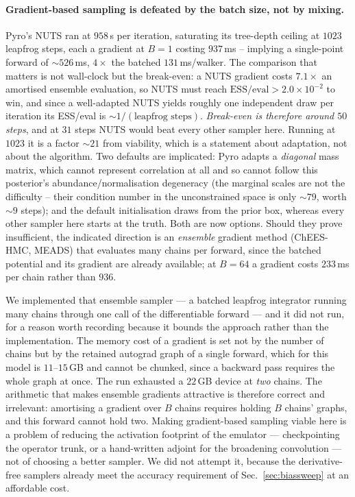 \documentclass[11pt,a4paper]{article}
\begin{document}
\paragraph{Gradient-based sampling is defeated by the batch size, not by
mixing.} Pyro's NUTS ran at $958\,$s per iteration, saturating its tree-depth
ceiling at $1023$ leapfrog steps, each a gradient at $B{=}1$ costing $937\,$ms
-- implying a single-point forward of ${\sim}526\,$ms, $4\times$ the batched
$131\,$ms/walker. The comparison that matters is not wall-clock but the
break-even: a NUTS gradient costs $7.1\times$ an amortised ensemble evaluation,
so NUTS must reach $\mathrm{ESS/eval}>2.0\times10^{-2}$ to win, and since a
well-adapted NUTS yields roughly one independent draw per iteration its
ESS/eval is ${\sim}1/(\text{leapfrog steps})$. \emph{Break-even is therefore
around $50$ steps}, and at $31$ steps NUTS would beat every other sampler here.
Running at $1023$ it is a factor ${\sim}21$ from viability, which is a statement
about adaptation, not about the algorithm. Two defaults are implicated: Pyro
adapts a \emph{diagonal} mass matrix, which cannot represent correlation at all
and so cannot follow this posterior's abundance/normalisation degeneracy (the
marginal scales are not the difficulty -- their condition number in the
unconstrained space is only ${\sim}79$, worth ${\sim}9$ steps); and the default
initialisation draws from the prior box, whereas every other sampler here starts
at the truth. Both are now options. Should they prove insufficient, the
indicated direction is an \emph{ensemble} gradient method (ChEES-HMC, MEADS)
that evaluates many chains per forward, since the batched potential and its
gradient are already available; at $B{=}64$ a gradient costs $233\,$ms per
chain rather than $936$.

We implemented that ensemble sampler --- a batched leapfrog integrator running
many chains through one call of the differentiable forward --- and it did not
run, for a reason worth recording because it bounds the approach rather than the
implementation. The memory cost of a gradient is set not by the number of chains
but by the retained autograd graph of a single forward, which for this model is
$11$--$15\,$GB and cannot be chunked, since a backward pass requires the whole
graph at once. The run exhausted a $22\,$GB device at \emph{two} chains. The
arithmetic that makes ensemble gradients attractive is therefore correct and
irrelevant: amortising a gradient over $B$ chains requires holding $B$ chains'
graphs, and this forward cannot hold two. Making gradient-based sampling viable
here is a problem of reducing the activation footprint of the emulator ---
checkpointing the operator trunk, or a hand-written adjoint for the broadening
convolution --- not of choosing a better sampler. We did not attempt it, because
the derivative-free samplers already meet the accuracy requirement of
Sec.~\ref{sec:biassweep} at an affordable cost.
\end{document}
